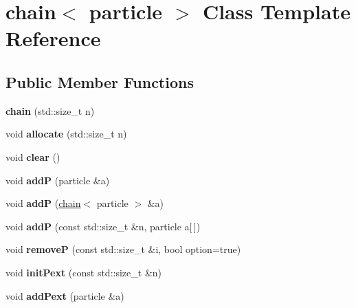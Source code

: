 \hypertarget{classchain}{
\section{chain$<$ particle $>$ Class Template Reference}
\label{classchain}
}
\subsection*{Public Member Functions}
\begin{DoxyCompactItemize}
\item 
\hypertarget{classchain_aca11deddacc14caff191f4273e634219}{
{\bfseries chain} (std::size\_\-t n)}
\label{classchain_aca11deddacc14caff191f4273e634219}

\item 
\hypertarget{classchain_a396b6a6ce8ed5e92dab4b6cf8ee0008d}{
void {\bfseries allocate} (std::size\_\-t n)}
\label{classchain_a396b6a6ce8ed5e92dab4b6cf8ee0008d}

\item 
\hypertarget{classchain_a63d5a11da8c3f0e0024fea9e8f2774bb}{
void {\bfseries clear} ()}
\label{classchain_a63d5a11da8c3f0e0024fea9e8f2774bb}

\item 
\hypertarget{classchain_a859cdc2249ee280069aa997d455c063b}{
void {\bfseries addP} (particle \&a)}
\label{classchain_a859cdc2249ee280069aa997d455c063b}

\item 
\hypertarget{classchain_a1ad83d089ce15a5bd09ec0bd47a8e0fc}{
void {\bfseries addP} (\hyperlink{classchain}{chain}$<$ particle $>$ \&a)}
\label{classchain_a1ad83d089ce15a5bd09ec0bd47a8e0fc}

\item 
\hypertarget{classchain_a93d170d4ad9431507be1f9430256ccc8}{
void {\bfseries addP} (const std::size\_\-t \&n, particle a\mbox{[}$\,$\mbox{]})}
\label{classchain_a93d170d4ad9431507be1f9430256ccc8}

\item 
\hypertarget{classchain_af5c4820f4118d6852fe981e752a505a0}{
void {\bfseries removeP} (const std::size\_\-t \&i, bool option=true)}
\label{classchain_af5c4820f4118d6852fe981e752a505a0}

\item 
\hypertarget{classchain_a06be7eb9dd22520e32a6530734522b22}{
void {\bfseries initPext} (const std::size\_\-t \&n)}
\label{classchain_a06be7eb9dd22520e32a6530734522b22}

\item 
\hypertarget{classchain_ae41d460ef51d06c4474285f866caea02}{
void {\bfseries addPext} (particle \&a)}
\label{classchain_ae41d460ef51d06c4474285f866caea02}


\end{DoxyCompactItemize}
